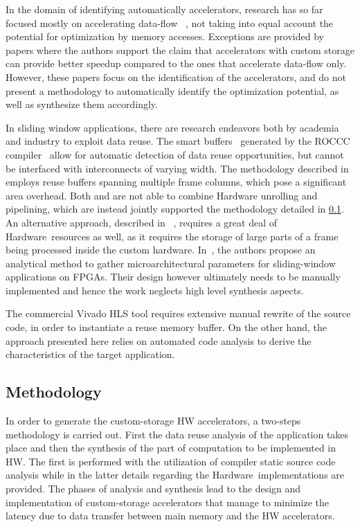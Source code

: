 \documentclass[]{usiinfthesis}
\newcommand{\HW}{{Hardware}}
\begin{document}
In the domain of identifying automatically accelerators, research has 
so far focused mostly on accelerating data-flow~\cite{GiaquintaMar15} \cite{GutinFeb12}, 
not taking into equal account the potential for optimization by memory accesses. 
Exceptions are provided by papers \cite{BiswasMar06} \cite{ HaaBOct2014}
where the authors support the claim that accelerators with custom
storage can provide better speedup compared to the ones that
accelerate data-flow only. However, these papers focus on the
identification of the accelerators, and do not present a methodology 
to automatically identify the optimization potential, as well as
synthesize them accordingly.\par
In sliding window applications, there are research endeavors
both by academia and industry to exploit data reuse. The smart
buffers~\cite{GuoJun04} generated by the ROCCC
compiler~\cite{VillarrealMay10} allow for automatic detection of data
reuse opportunities, but cannot be interfaced 
with interconnects of varying width.
%
The methodology
described in \cite{MeeusMar14} employs reuse buffers spanning multiple
frame columns, which pose a significant area
overhead. Both \cite{GuoJun04} and \cite{MeeusMar14} are not able
to combine Hardware unrolling and pipelining, which are instead jointly
supported the methodology detailed in \ref{sec:dr_meth}. An alternative 
approach, described in
~\cite{DongMar07}, requires a great deal of \HW\ resources as well, as it 
requires the storage of large parts of a frame being processed inside the custom
hardware.  In~\cite{LeeserApr06}, the authors propose an analytical
method to gather microarchitectural parameters for sliding-window
applications on FPGAs. Their design however ultimately needs to be
manually implemented and hence the work neglects high level synthesis
aspects.\par
%
The commercial Vivado HLS tool requires
extensive manual rewrite of the source code, in order to instantiate
a reuse memory buffer. On the other hand, the approach presented 
here relies on automated code
analysis to derive the characteristics of the target application.\par 



\subsection{Methodology}
\label{sec:dr_meth}

In order to generate the custom-storage HW accelerators, a two-steps methodology is 
carried out. First the data reuse analysis of the application takes place and 
then the synthesis of the part of computation to be implemented in HW.
The first is performed with the utilization of compiler static source code analysis while
in the latter details regarding the \HW\ implementations are provided.
The phases of analysis and synthesis lead to the design and implementation of 
custom-storage accelerators that manage to minimize the latency due to data 
transfer between main memory and the HW accelerators.
\end{document}

